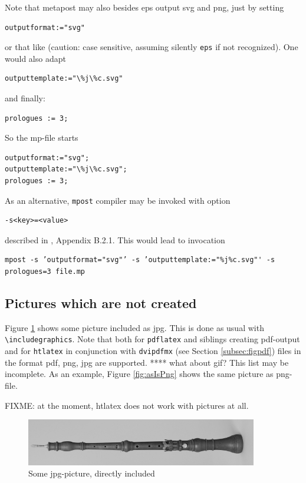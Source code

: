 \documentclass[12pt]{article}
\begin{document}
Note that metapost may also besides \gls{eps} output \gls{svg} and \gls{png}, 
just by setting 
%
\begin{verbatim}
outputformat:="svg" 
\end{verbatim}
%
or that like 
(caution: case sensitive, assuming silently {\tt eps} if not recognized). 
One would also adapt 
%
\begin{verbatim}
outputtemplate:="\%j\%c.svg"
\end{verbatim}
%
and finally: 
%
\begin{verbatim}
prologues := 3;
\end{verbatim}

So the mp-file starts 
%
\lstset{language=metapost, basicstyle=\normalsize}
\begin{lstlisting}
outputformat:="svg";
outputtemplate:="\%j\%c.svg";
prologues := 3;
\end{lstlisting}

As an alternative, {\tt mpost} compiler may be invoked with option 
%
\begin{verbatim}
-s<key>=<value>
\end{verbatim}
%
described in \cite{MPost}, Appendix B.2.1. 
This would lead to invocation 
%
\begin{Verbatim}[fontsize=\scriptsize]
mpost -s ’outputformat="svg"’ -s ’outputtemplate:="%j%c.svg"' -s prologues=3 file.mp
\end{Verbatim}

\subsection{Pictures which are not created}\label{subsec:picasis}

Figure \ref{fig:asIsJpg} shows some picture included as jpg. 
This is done as usual with {\tt\textbackslash includegraphics}. 
Note that both for {\tt pdflatex} and siblings creating pdf-output 
and for {\tt htlatex} in conjunction with {\tt dvipdfmx} 
(see Section \ref{subsec:figpdf}) 
files in the format pdf, \gls{png}, \gls{jpg} are supported. 
 **** what about \gls{gif}? 
This list may be incomplete. 
As an example, Figure \ref{fig:asIsPng} shows the same picture 
as png-file. 

FIXME: at the moment, htlatex does not work with pictures at all. 

\begin{figure}[htb]
\begin{center}
\includegraphics[width=0.9\textwidth]{06someJpgOboeBaroqueDennerMIR370.jpg}%
\end{center}
\caption{\label{fig:asIsJpg}Some jpg-picture, directly included }
\end{figure}
\end{document}
